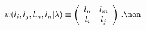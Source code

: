 \begin{equation}
w(l_{i},l_{j},l_{m},l_{n}\vert \lambda)\equiv \left(
           \begin{array}{cc}
             l_{n}   &l_{m}         \\
              l_{i}   & l_{j}      \\
                                                         \end{array}\right)\,.\non\\
\label{boltzmann}
\end{equation}

